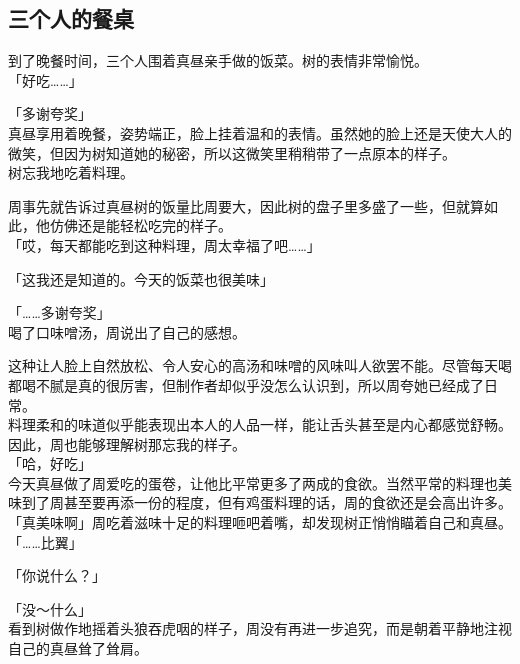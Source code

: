 \subsection{三个人的餐桌}

到了晚餐时间，三个人围着真昼亲手做的饭菜。树的表情非常愉悦。\\

「好吃……」

「多谢夸奖」\\

真昼享用着晚餐，姿势端正，脸上挂着温和的表情。虽然她的脸上还是天使大人的微笑，但因为树知道她的秘密，所以这微笑里稍稍带了一点原本的样子。\\

树忘我地吃着料理。

周事先就告诉过真昼树的饭量比周要大，因此树的盘子里多盛了一些，但就算如此，他仿佛还是能轻松吃完的样子。\\

「哎，每天都能吃到这种料理，周太幸福了吧……」

「这我还是知道的。今天的饭菜也很美味」

「……多谢夸奖」\\

喝了口味噌汤，周说出了自己的感想。

这种让人脸上自然放松、令人安心的高汤和味噌的风味叫人欲罢不能。尽管每天喝都喝不腻是真的很厉害，但制作者却似乎没怎么认识到，所以周夸她已经成了日常。\\

料理柔和的味道似乎能表现出本人的人品一样，能让舌头甚至是内心都感觉舒畅。因此，周也能够理解树那忘我的样子。\\

「哈，好吃」\\

今天真昼做了周爱吃的蛋卷，让他比平常更多了两成的食欲。当然平常的料理也美味到了周甚至要再添一份的程度，但有鸡蛋料理的话，周的食欲还是会高出许多。\\

「真美味啊」周吃着滋味十足的料理咂吧着嘴，却发现树正悄悄瞄着自己和真昼。\\

「……比翼」

「你说什么？」

「没～什么」\\

看到树做作地摇着头狼吞虎咽的样子，周没有再进一步追究，而是朝着平静地注视自己的真昼耸了耸肩。\\

